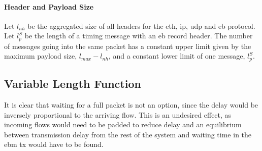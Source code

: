 \paragraph{Header and Payload Size}
Let $l_{nh}$ be the aggregated size of all headers for the \gls{eth}, \gls{ip}, \gls{udp} and \gls{eb} protocol. Let $l^S_p$ be the length of a timing message with an \gls{eb} record header. The number of messages going into the same packet has a constant upper limit given by the maximum payload size, $l_{max} - l_{nh}$, and a constant lower limit of one message, $l^S_p$.

\subsection{Variable Length Function}

It is clear that waiting for a full packet is not an option, since the delay would be inversely proportional to the arriving flow.
This is an undesired effect, as incoming flows would need to be padded to reduce delay and an equilibrium between transmission delay from the rest of the system
and waiting time in the \gls{ebm} \gls{tx} would have to be found.

